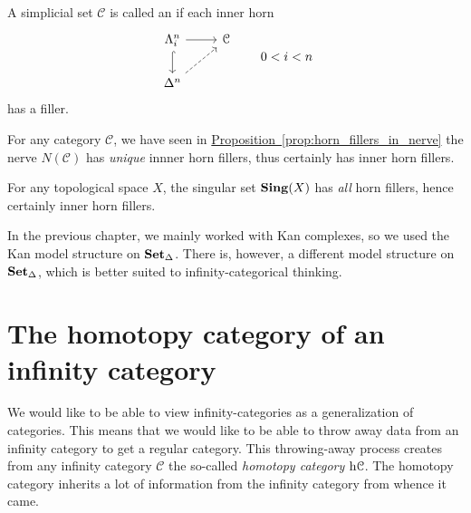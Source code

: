 \documentclass[main.tex]{subfiles}
\begin{document}
\begin{definition}
  \label{def:infinity_category}
  A simplicial set $\mathcal{C}$ is called an  if each inner horn
  \begin{equation*}
    \begin{tikzcd}
      \Lambda^{n}_{i}
      \arrow[r]
      \arrow[d, hookrightarrow]
      & \mathcal{C}
      \\
      \Delta^{n}
      \arrow[ur, dashed]
    \end{tikzcd}
    \qquad 0 < i < n
  \end{equation*}
  has a filler.
\end{definition}

\begin{example}
  \label{eg:nerve_of_category_is_infinity_category}
  For any category $\mathcal{C}$, we have seen in \hyperref[prop:horn_fillers_in_nerve]{Proposition~\ref*{prop:horn_fillers_in_nerve}} the nerve $N(\mathcal{C})$ has \emph{unique} innner horn fillers, thus certainly has inner horn fillers.
\end{example}

\begin{example}
  \label{eg:singular_set_of_topological_space_is_infinity_categeory}
  For any topological space $X$, the singular set $\mathbf{Sing}(X)$ has \emph{all} horn fillers, hence certainly inner horn fillers.
\end{example}

In the previous chapter, we mainly worked with Kan complexes, so we used the Kan model structure on $\operatorname{\mathbf{Set}_{\Delta}}$. There is, however, a different model structure on $\operatorname{\mathbf{Set}_{\Delta}}$, which is better suited to infinity-categorical thinking.

\section{The homotopy category of an infinity category}
\label{sec:the_homotopy_category_of_an_infinity_category}

We would like to be able to view infinity-categories as a generalization of categories. This means that we would like to be able to throw away data from an infinity category to get a regular category. This throwing-away process creates from any infinity category $\mathcal{C}$ the so-called \emph{homotopy category} $\mathrm{h} \mathcal{C}$. The homotopy category inherits a lot of information from the infinity category from whence it came.
\end{document}
